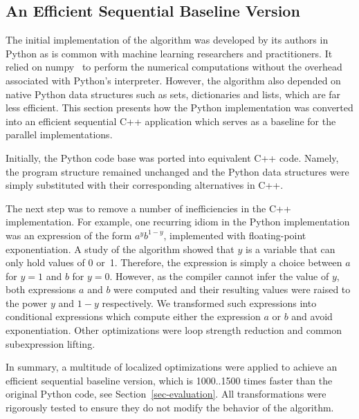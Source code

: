 \subsection{An Efficient Sequential Baseline Version}
\label{sec-design-sequential}

The initial implementation of the algorithm was developed by its authors in
Python as is common with machine learning researchers and practitioners. It
relied on numpy~\cite{numpy} to perform the numerical computations without the
overhead associated with Python's interpreter. However, the algorithm also
depended on native Python data structures such as sets, dictionaries and
lists, which are far less efficient.
This section presents how the Python implementation was
converted into an efficient sequential C++ application which serves as a
baseline for the parallel implementations.

Initially, the Python code base was ported into equivalent C++ code. Namely,
the program structure remained unchanged and the Python data structures were
simply substituted with their corresponding alternatives in C++.

The next step was to remove a number of inefficiencies in the C++
implementation. For example, one recurring idiom in the Python implementation
was an expression of the form $a^y b^{1-y}$, implemented with floating-point
exponentiation. A study of the algorithm showed that $y$ is a variable that can
only hold values of 0 or~1. Therefore, the expression is simply a choice
between $a$ for $y=1$ and $b$ for $y=0$. However, as the compiler cannot infer
the value of $y$, both expressions $a$ and $b$ were computed and their
resulting values were raised to the power $y$ and $1-y$ respectively.
We transformed such expressions into conditional expressions which
compute either the expression $a$ or $b$ and avoid exponentiation.
%
Other optimizations were loop strength
reduction and common subexpression lifting.

In summary, a multitude of localized optimizations were applied to achieve
an efficient sequential baseline version, which is 1000..1500 times faster
than the original Python code, see Section~\ref{sec-evaluation}.
All transformations were rigorously tested to ensure they do
not modify the behavior of the algorithm.

\begin{comment}
Further, we replaced calls to the system's random
functions with a custom implementation of the random generator
\textit{xorshift\_128}~\cite{Marsaglia:2003:XR}. This way, random calls no longer
involve system calls, so we can support easy and fast multi-threaded random
calls by providing each thread with its private, differently seeded, random
generator.
\end{comment}
